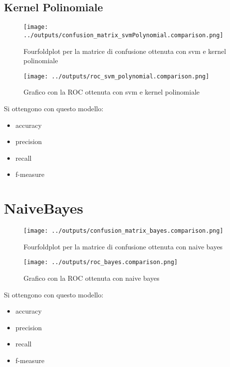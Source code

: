 \subsection{Kernel Polinomiale}
\begin{figure}[H]
    \centering
    \texttt{[image: ../outputs/confusion\_matrix\_svmPolynomial.comparison.png]}
    \caption{Fourfoldplot per la matrice di confusione ottenuta con svm e kernel polinomiale}
\end{figure}
\begin{figure}[H]
    \centering
    \texttt{[image: ../outputs/roc\_svm\_polynomial.comparison.png]}
    \caption{Grafico con la ROC ottenuta con svm e kernel polinomiale}
\end{figure}
Si ottengono con questo modello:
\begin{itemize}
    \item accuracy
    \item precision
    \item recall
    \item f-measure
\end{itemize}
\section{NaiveBayes}
\begin{figure}[H]
    \centering
    \texttt{[image: ../outputs/confusion\_matrix\_bayes.comparison.png]}
    \caption{Fourfoldplot per la matrice di confusione ottenuta con naive bayes}
\end{figure}
\begin{figure}[H]
    \centering
    \texttt{[image: ../outputs/roc\_bayes.comparison.png]}
    \caption{Grafico con la ROC ottenuta con naive bayes}
\end{figure}
Si ottengono con questo modello:
\begin{itemize}
    \item accuracy
    \item precision
    \item recall
    \item f-measure
\end{itemize}


